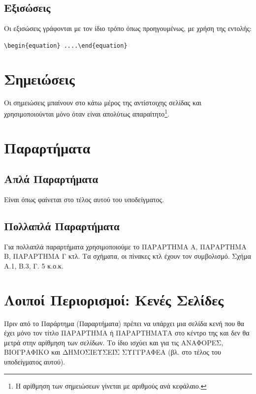 \newpage


\subsection{Εξισώσεις} \label{sec:2.4.3}
Οι εξισώσεις γράφονται με τον ίδιο τρόπο όπως προηγουμένως, με
χρήση της εντολής:

\chl \bs \s\s

\verb"\begin{equation} ....\end{equation}"




\section{Σημειώσεις}
\label{sec:2.5}

Οι σημειώσεις μπαίνουν στο κάτω μέρος της αντίστοιχης σελίδας και
χρησιμοποιούνται μόνο όταν είναι απολύτως απαραίτητο\footnote{Η
αρίθμηση των σημειώσεων γίνεται με αριθμούς ανά κεφάλαιο.}.




\section{Παραρτήματα}
\label{sec:2.6}

\subsection{Απλά Παραρτήματα} \label{sec:2.6.1}
Είναι όπως φαίνεται στο τέλος αυτού του υποδείγματος.

\subsection{Πολλαπλά Παραρτήματα} \label{sec:2.6.2}
Για πολλαπλά παραρτήματα χρησιμοποιούμε το ΠΑΡΑΡΤΗΜΑ Α, ΠΑΡΑΡΤΗΜΑ
Β, ΠΑΡΑΡΤΗΜΑ Γ κτλ. Τα σχήματα, οι πίνακες κτλ έχουν τον
συμβολισμό. Σχήμα Α.1, Β.3, Γ. 5 κ.ο.κ.



\section{Λοιποί Περιορισμοί: Κενές Σελίδες}
\label{sec:2.7}

Πριν από το Παράρτημα (Παραρτήματα) πρέπει να υπάρχει μια σελίδα
κενή που θα έχει μόνο τον τίτλο ΠΑΡΑΡΤΗΜΑ ή ΠΑΡΑΡΤΗΜΑΤΑ στο κέντρο
της και δεν θα μετρά στην αρίθμηση των σελίδων.  Το ίδιο ισχύει
και για τις ΑΝΑΦΟΡΕΣ, ΒΙΟΓΡΑΦΙΚΟ και ΔΗΜΟΣΙΕΥΣΕΙΣ ΣΥΓΓΡΑΦΕΑ (βλ.
στο τέλος του υποδείγματος αυτού).


